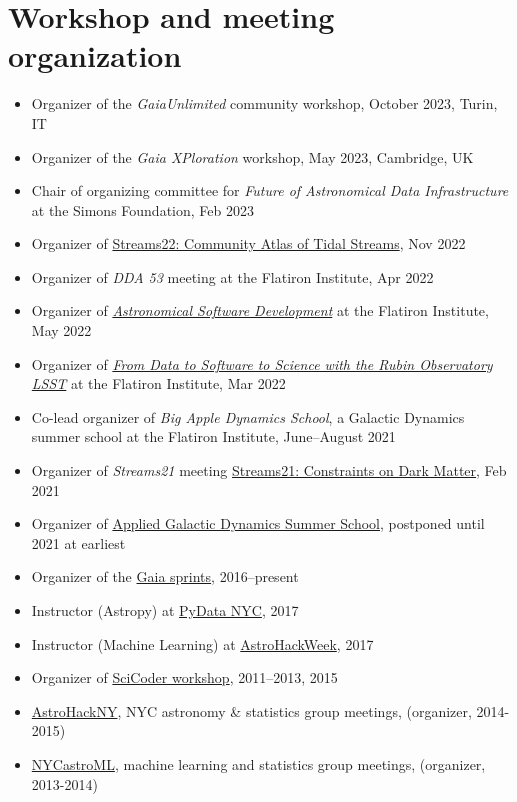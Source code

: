 \documentclass[12pt, letterpaper]{apw-cv}
\begin{document}
\section*{Workshop and meeting organization}

\begin{itemize}
    \item Organizer of the \emph{GaiaUnlimited} community workshop, October 2023, Turin, IT
    \item Organizer of the \emph{Gaia XPloration} workshop, May 2023, Cambridge, UK
    \item Chair of organizing committee for \textit{Future of Astronomical Data Infrastructure} at the Simons Foundation, Feb 2023
    \item Organizer of \href{https://stellarstreams.org/streams22}{Streams22: Community Atlas of Tidal Streams}, Nov 2022
    \item Organizer of \textit{DDA 53} meeting at the Flatiron Institute, Apr 2022
    \item Organizer of \href{https://code.astrodata.nyc/}{\textit{Astronomical Software Development}} at the Flatiron Institute, May 2022
    \item Organizer of \href{https://indico.flatironinstitute.org/event/2777/}{\textit{From Data to Software to Science with the Rubin Observatory LSST}} at the Flatiron Institute, Mar 2022
    \item Co-lead organizer of \textit{Big Apple Dynamics School}, a Galactic Dynamics summer school at the Flatiron Institute, June--August 2021
    \item Organizer of \textit{Streams21} meeting \href{https://stellarstreams.org/streams21}{Streams21: Constraints on Dark Matter}, Feb 2021
    \item Organizer of \href{http://galacticdynamics.nyc/}{Applied Galactic Dynamics Summer School}, postponed until 2021 at earliest
    \item Organizer of the \href{http://gaia.lol}{Gaia sprints}, 2016--present
    \item Instructor (Astropy) at \href{http://pydata.org/nyc2017}{PyData NYC}, 2017
    \item Instructor (Machine Learning) at \href{http://astrohackweek.org}{AstroHackWeek}, 2017
    \item Organizer of \href{http://scicoder.org}{SciCoder workshop}, 2011--2013, 2015
    \item \href{https://groups.google.com/forum/#!forum/astrohackny}{AstroHackNY}, NYC astronomy \& statistics group meetings, (organizer, 2014-2015)
    \item \href{https://github.com/adrn/nycastroml}{NYCastroML}, machine learning and statistics group meetings, (organizer, 2013-2014)
\end{itemize}
\end{document}
